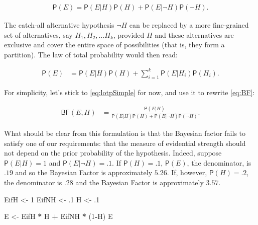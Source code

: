 \documentclass[10pt,dvipsnames,enabledeprecatedfontcommands]{scrartcl}
\newenvironment{Shaded}{\begin{snugshade}}{\end{snugshade}}
\newcommand{\DecValTok}[1]{\textcolor[rgb]{0.00,0.00,0.81}{#1}}
\newcommand{\FloatTok}[1]{\textcolor[rgb]{0.00,0.00,0.81}{#1}}
\newcommand{\StringTok}[1]{\textcolor[rgb]{0.31,0.60,0.02}{#1}}
\newcommand{\OperatorTok}[1]{\textcolor[rgb]{0.81,0.36,0.00}{\textbf{#1}}}
\newcommand{\NormalTok}[1]{#1}
\newcommand{\pr}[1]{\mathsf{P}(#1)}
\begin{document}
\vspace{-3mm}

\begin{align} \label{eq:lotpSimple}
\pr{E}= \pr{E \vert H} \pr{H}+\pr{E \vert \neg H} \pr{\neg H}.
\end{align}

\noindent The catch-all alternative hypothesis \(\neg H\) can be
replaced by a more fine-grained set of alternatives, say
\(H_1, H_2, \dots H_k\), provided \(H\) and these alternatives are
exclusive and cover the entire space of possibilities (that is, they
form a partition). The law of total probability would then read:

\begin{align} \label{eq:lotpLong}
\pr{E} & = \pr{E\vert H}\pr{H} +\sum_{i=1}^k \pr{E\vert H_i}\pr{H_i}. 
\end{align}

\noindent For simplicity, let's stick to \eqref{eq:lotpSimple} for now,
and use it to rewrite \eqref{eq:BF}:

\begin{align}\label{eq:BFlotp}
\mathsf{BF}(E,H) & = \frac{\pr{E \vert H}}{\pr{E \vert H} \pr{H}+\pr{E \vert \neg H} \pr{\neg H}}.
\end{align}

\noindent What should be clear from this formulation is that the
Bayesian factor fails to satisfy one of our requirements: that the
measure of evidential strength should not depend on the prior
probability of the hypothesis. Indeed, suppose \(\pr{E \vert H} = 1\)
and \(\pr{E \vert \neg H} = .1\). If \(\pr{H}=.1\), \(\pr{E}\), the
denominator, is \(.19\) and so the Bayesian Factor is approximately
\(5.26\). If, however, \(\pr{H} =.2\), the denominator is \(.28\) and
the Bayesian Factor is approximately
\(3.57\).

\footnotesize

\begin{Shaded}
\begin{Highlighting}[]
\NormalTok{EifH <-}\StringTok{ }\DecValTok{1}
\NormalTok{EifNH <-}\StringTok{ }\FloatTok{.1}
\NormalTok{H <-}\StringTok{ }\FloatTok{.1}

\NormalTok{E <-}\StringTok{ }\NormalTok{EifH }\OperatorTok{*}\StringTok{ }\NormalTok{H }\OperatorTok{+}\StringTok{ }\NormalTok{EifNH }\OperatorTok{*}\StringTok{ }\NormalTok{(}\DecValTok{1}\OperatorTok{-}\NormalTok{H)}
\NormalTok{E}
\end{Highlighting}
\end{Shaded}
\end{document}
